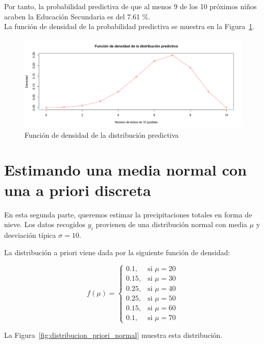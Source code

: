 \documentclass[12pt,a4paper,twoside,openright,titlepage,final]{article}
\begin{document}
Por tanto, la probabilidad predictiva de que al menos 9 de los 10 próximos niños acaben la Educación Secundaria es del 7.61 \%.\\

La función de densidad de la probabilidad predictiva se muestra en la Figura~\ref{fig:distribucion_predictiva_beta}.

\begin{figure}[tbph!]
\centering
\includegraphics[width=0.9\linewidth]{./imagenes/distribucion_predictiva_beta}
\caption{Función de densidad de la distribución predictiva}
\label{fig:distribucion_predictiva_beta}
\end{figure}

\section{Estimando una media normal con una a priori discreta}

En esta segunda parte, queremos estimar la precipitaciones totales en forma de nieve. Los datos recogidos $y_i$ provienen de una distribución normal con media $\mu$ y desviación típica $\sigma = 10$.

La distribución a priori viene dada por la siguiente función de densidad:

\begin{equation*}
f(\mu) = \begin{cases}
0.1, & \text{si } \mu = 20 \\
0.15, & \text{si } \mu = 30 \\ 
0.25, & \text{si } \mu = 40 \\
0.25, & \text{si } \mu = 50 \\ 
0.15, & \text{si } \mu = 60 \\
0.1, & \text{si } \mu = 70
\end{cases}
\end{equation*}

La Figura~\ref{fig:distribucion_priori_normal} muestra esta distribución.
\end{document}
